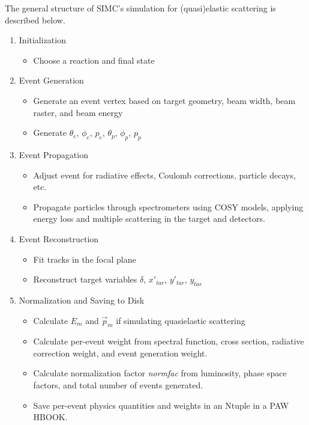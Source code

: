 The general structure of SIMC's simulation for (quasi)elastic
scattering is described below.
\begin{enumerate}
    \item Initialization
    \begin{itemize}
        \item Choose a reaction and final state
    \end{itemize}

    \item Event Generation
    \begin{itemize}
        \item Generate an event vertex based on target geometry,
              beam width, beam raster, and beam energy
        \item Generate $\theta_e$, $\phi_e$, $p_e$,
                       $\theta_p$, $\phi_p$, $p_p$
    \end{itemize}

    \item Event Propagation
    \begin{itemize}
        \item Adjust event for radiative effects, Coulomb corrections, particle decays, etc.
        \item Propagate particles through spectrometers using COSY models,
              applying energy loss and multiple scattering in the target and
              detectors.
    \end{itemize}

    \item Event Reconstruction
    \begin{itemize}
        \item Fit tracks in the focal plane
        \item Reconstruct target variables $\delta$, $x'_{tar}$, $y'_{tar}$, $y_{tar}$
    \end{itemize}

    \item Normalization and Saving to Disk
    \begin{itemize}
        \item Calculate $E_m$ and $\vec{p}_m$ if simulating quasielastic scattering
        \item Calculate per-event weight from spectral function, cross section,
              radiative correction weight, and event generation weight.
        \item Calculate normalization factor \textit{normfac} from luminosity,
              phase space factors, and total number of events generated.
        \item Save per-event physics quantities and weights in an Ntuple in a
              PAW HBOOK.
    \end{itemize}
\end{enumerate}

